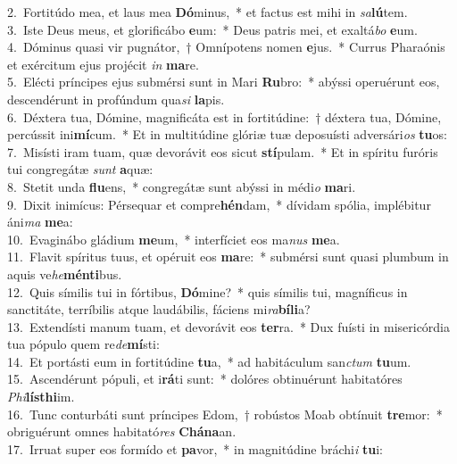 {2.~}Fortitúdo mea, et laus mea \textbf{Dó}minus,~* et factus est mihi in \textit{sa}\textbf{lú}tem.\\
{3.~}Iste Deus meus, et glorificábo \textbf{e}um:~* Deus patris mei, et exaltá\textit{bo} \textbf{e}um.\\
{4.~}Dóminus quasi vir pugnátor,~† Omnípotens nomen \textbf{e}jus.~* Currus Pharaónis et exércitum ejus projécit \textit{in} \textbf{ma}re.\\
{5.~}Elécti príncipes ejus submérsi sunt in Mari \textbf{Ru}bro:~* abýssi operuérunt eos, descendérunt in profúndum qua\textit{si} \textbf{la}pis.\\
{6.~}Déxtera tua, Dómine, magnificáta est in fortitúdine:~† déxtera tua, Dómine, percússit ini\textbf{mí}cum.~* Et in multitúdine glóriæ tuæ deposuísti adversári\textit{os} \textbf{tu}os:\\
{7.~}Misísti iram tuam, quæ devorávit eos sicut \textbf{stí}pulam.~* Et in spíritu furóris tui congregátæ \textit{sunt} \textbf{a}quæ:\\
{8.~}Stetit unda \textbf{flu}ens,~* congregátæ sunt abýssi in médi\textit{o} \textbf{ma}ri.\\
{9.~}Dixit inimícus: Pérsequar et compre\textbf{hén}dam,~* dívidam spólia, implébitur áni\textit{ma} \textbf{me}a:\\
{10.~}Evaginábo gládium \textbf{me}um,~* interfíciet eos ma\textit{nus} \textbf{me}a.\\
{11.~}Flavit spíritus tuus, et opéruit eos \textbf{ma}re:~* submérsi sunt quasi plumbum in aquis ve\textit{he}\textbf{mén}\textbf{ti}bus.\\
{12.~}Quis símilis tui in fórtibus, \textbf{Dó}mine?~* quis símilis tui, magníficus in sanctitáte, terríbilis atque laudábilis, fáciens mi\textit{ra}\textbf{bí}\textbf{li}a?\\
{13.~}Extendísti manum tuam, et devorávit eos \textbf{ter}ra.~* Dux fuísti in misericórdia tua pópulo quem re\textit{de}\textbf{mí}sti:\\
{14.~}Et portásti eum in fortitúdine \textbf{tu}a,~* ad habitáculum san\textit{ctum} \textbf{tu}um.\\
{15.~}Ascendérunt pópuli, et i\textbf{rá}ti sunt:~* dolóres obtinuérunt habitatóres \textit{Phi}\textbf{lís}\textbf{thi}im.\\
{16.~}Tunc conturbáti sunt príncipes Edom,~† robústos Moab obtínuit \textbf{tre}mor:~* obriguérunt omnes habitató\textit{res} \textbf{Chá}\textbf{na}an.\\
{17.~}Irruat super eos formído et \textbf{pa}vor,~* in magnitúdine bráchi\textit{i} \textbf{tu}i:\\

